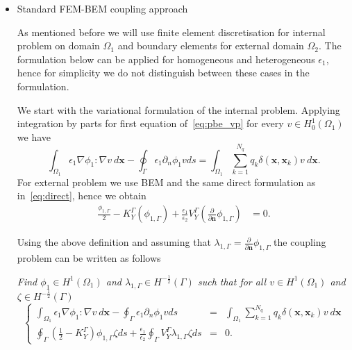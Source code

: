 \begin{itemize}
    \item Standard FEM-BEM coupling approach
   
   As mentioned before we will use finite element discretisation for internal problem on domain $\Omega_1$ and boundary elements for external domain $\Omega_2$. The formulation below can be applied for homogeneous and heterogeneous $\epsilon_1$, hence for simplicity we do not distinguish between these cases in the formulation.
    
    We start with the variational formulation of the internal problem. Applying integration by parts for first equation of~\eqref{eq:pbe_vp} for every $v \in H_0^1(\Omega_1)$ we have
\begin{equation}
\label{eq:fem}
 \int_{\Omega_1} \epsilon_1 \nabla \phi_1 : \nabla v ~d\mathbf{x}  - \oint_\Gamma \epsilon_1\partial_n \phi_1 v ds =   \int_{\Omega_1}  \sum_{k=1}^{N_q} q_k\delta(\mathbf{x},\mathbf{x}_k)  v ~d\mathbf{x}.
\end{equation}
For external problem we use BEM and the same direct formulation as in~\eqref{eq:direct}, hence we obtain
\begin{align*}
\frac{\phi_{1,\Gamma}}{2} - K_{Y}^{\Gamma}(\phi_{1,\Gamma}) + \frac{\epsilon_1}{\epsilon_2}V_{Y}^{\Gamma} \left( \frac{\partial}{\partial \mathbf{n}} \phi_{1,\Gamma} \right) & = 0.
\end{align*}

Using the above definition and assuming that $\lambda_{1,\Gamma}  = \frac{\partial}{\partial \mathbf{n}} \phi_{1,\Gamma} $ the coupling problem can be written as follows
\begin{center}
  \textit{Find $ \phi_1 \in H^1(\Omega_1)$ and $\lambda_{1,\Gamma} \in H^{-\frac{1}{2}}(\Gamma)$ such that for all $v \in H^1(\Omega_1)$ and $\zeta \in H^{-\frac{1}{2}}(\Gamma)$}
\begin{equation} 
\label{eq:standard_fem_bem}
 \left\{
 \begin{array}{rcl}
 \int_{\Omega_1} \epsilon_1 \nabla \phi_1 : \nabla v ~d\mathbf{x}  - \oint_\Gamma \epsilon_1\partial_n \phi_1 v ds &=&   \int_{\Omega_1}  \sum_{k=1}^{N_q} q_k\delta(\mathbf{x},\mathbf{x}_k)  v ~d\mathbf{x} \\[3mm] 
  \oint_\Gamma \left(\tfrac{1}{2} - K_{Y}^{\Gamma}\right) \phi_{1,\Gamma} \zeta ds + \frac{\epsilon_1}{\epsilon_2} \oint_\Gamma V_{Y}^{\Gamma} \lambda_{1,\Gamma} \zeta ds &=&0.
  \end{array}
  \right.
\end{equation}
\end{center}



\end{itemize}
